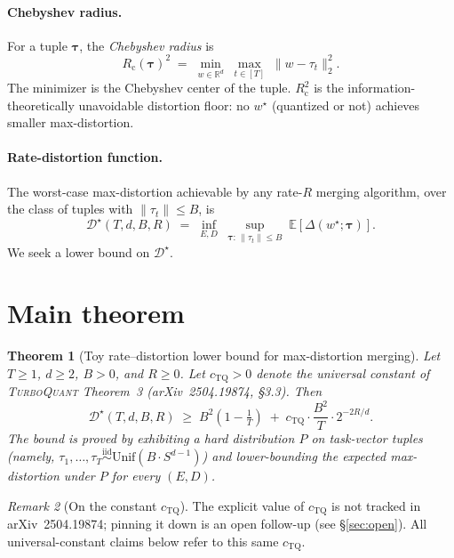 \documentclass{article}
\newtheorem{theorem}{Theorem}
\theoremstyle{remark}
\newtheorem{remark}[theorem]{Remark}
\newcommand{\R}{\mathbb{R}}
\newcommand{\E}{\mathbb{E}}
\newcommand{\cheb}{R_{\mathrm{c}}}
\begin{document}
\paragraph{Chebyshev radius.} For a tuple $\boldsymbol\tau$, the
\emph{Chebyshev radius} is
\[
  \cheb(\boldsymbol\tau)^2
  \;=\; \min_{w \in \R^d}\;\max_{t\in[T]}\;\|w - \tau_t\|_2^2.
\]
The minimizer is the Chebyshev center of the tuple. $\cheb^2$ is the
information-theoretically unavoidable distortion floor: no $w^\star$
(quantized or not) achieves smaller max-distortion.

\paragraph{Rate-distortion function.} The worst-case max-distortion
achievable by any rate-$R$ merging algorithm, over the class of
tuples with $\|\tau_t\| \leq B$, is
\begin{equation}\label{eq:rd-def}
  \mathcal{D}^\star(T,d,B,R)
  \;=\; \inf_{E, D}\; \sup_{\boldsymbol\tau:\,\|\tau_t\|\leq B}\;
  \E\!\left[\Delta(w^\star; \boldsymbol\tau)\right].
\end{equation}
We seek a lower bound on $\mathcal{D}^\star$.

\section{Main theorem}\label{sec:main}

\begin{theorem}[Toy rate--distortion lower bound for max-distortion
merging]\label{thm:toy}
Let $T \geq 1$, $d \geq 2$, $B > 0$, and $R \geq 0$. Let
$c_{\mathrm{TQ}} > 0$ denote the universal constant of
\textsc{TurboQuant} Theorem~3 (arXiv~2504.19874, \S3.3). Then
\begin{equation}\label{eq:thm-main}
  \mathcal{D}^\star(T, d, B, R)
  \;\geq\;
  B^2\!\left(1 - \tfrac{1}{T}\right)
  \;+\; c_{\mathrm{TQ}} \cdot \frac{B^2}{T}\cdot 2^{-2R/d}.
\end{equation}
The bound is proved by exhibiting a hard distribution $P$ on
task-vector tuples (namely, $\tau_1,\dots,\tau_T \stackrel{\mathrm{iid}}{\sim}
\mathrm{Unif}(B\cdot S^{d-1})$) and lower-bounding the
expected max-distortion under $P$ for every $(E,D)$.
\end{theorem}

\begin{remark}[On the constant $c_{\mathrm{TQ}}$]
The explicit value of $c_{\mathrm{TQ}}$ is not tracked in
arXiv~2504.19874; pinning it down is an open follow-up (see
\S\ref{sec:open}). All universal-constant claims below refer to this
same $c_{\mathrm{TQ}}$.
\end{remark}
\end{document}
